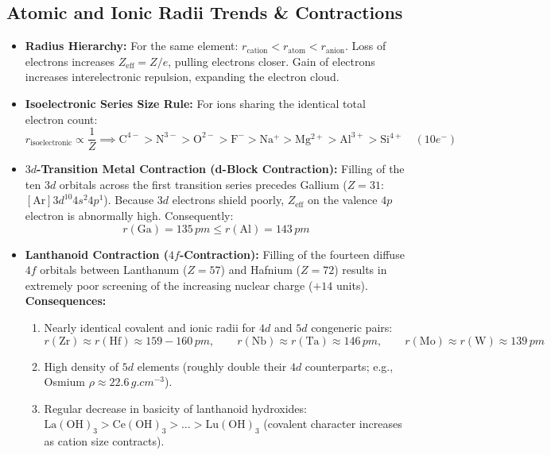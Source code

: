 \documentclass[10pt,a4paper]{article}
\begin{document}
\subsection{Atomic and Ionic Radii Trends \& Contractions}
\begin{itemize}
  \item \textbf{Radius Hierarchy:} For the same element: $r_{\text{cation}} < r_{\text{atom}} < r_{\text{anion}}$.
  Loss of electrons increases $Z_{\text{eff}} = Z/e$, pulling electrons closer. Gain of electrons increases interelectronic repulsion, expanding the electron cloud.
  \item \textbf{Isoelectronic Series Size Rule:} For ions sharing the identical total electron count:
  \begin{equation}
    r_{\text{isoelectronic}} \propto \frac{1}{Z} \implies \mathrm{C^{4-} > N^{3-} > O^{2-} > F^- > Na^+ > Mg^{2+} > Al^{3+} > Si^{4+}} \quad (10e^-)
  \end{equation}
  \item \textbf{$3d$-Transition Metal Contraction (d-Block Contraction):}
  Filling of the ten $3d$ orbitals across the first transition series precedes Gallium ($Z=31$: $[\mathrm{Ar}] 3d^{10} 4s^2 4p^1$). Because $3d$ electrons shield poorly, $Z_{\text{eff}}$ on the valence $4p$ electron is abnormally high. Consequently:
  \begin{equation}
    r(\mathrm{Ga}) = 135\,\si{pm} \le r(\mathrm{Al}) = 143\,\si{pm}
  \end{equation}
  \item \textbf{Lanthanoid Contraction ($4f$-Contraction):}
  Filling of the fourteen diffuse $4f$ orbitals between Lanthanum ($Z=57$) and Hafnium ($Z=72$) results in extremely poor screening of the increasing nuclear charge ($+14$ units).
  \textbf{Consequences:}
  \begin{enumerate}
    \item Nearly identical covalent and ionic radii for $4d$ and $5d$ congeneric pairs:
    \begin{equation}
      r(\mathrm{Zr}) \approx r(\mathrm{Hf}) \approx 159-160\,\si{pm}, \qquad r(\mathrm{Nb}) \approx r(\mathrm{Ta}) \approx 146\,\si{pm}, \qquad r(\mathrm{Mo}) \approx r(\mathrm{W}) \approx 139\,\si{pm}
    \end{equation}
    \item High density of $5d$ elements (roughly double their $4d$ counterparts; e.g., Osmium $\rho \approx 22.6\,\si{g.cm^{-3}}$).
    \item Regular decrease in basicity of lanthanoid hydroxides: $\mathrm{La(OH)_3 > Ce(OH)_3 > \dots > Lu(OH)_3}$ (covalent character increases as cation size contracts).
  \end{enumerate}
\end{itemize}
\end{document}
